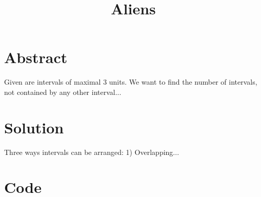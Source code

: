 \documentclass[12pt]{report}
\begin{document}
\title{Aliens}

\section{Abstract}
Given are intervals of maximal 3 units. We want to find the number of intervals, not contained by any other interval...


\section{Solution}
Three ways intervals can be arranged:
1) Overlapping...

\section{Code}

\end{document}
